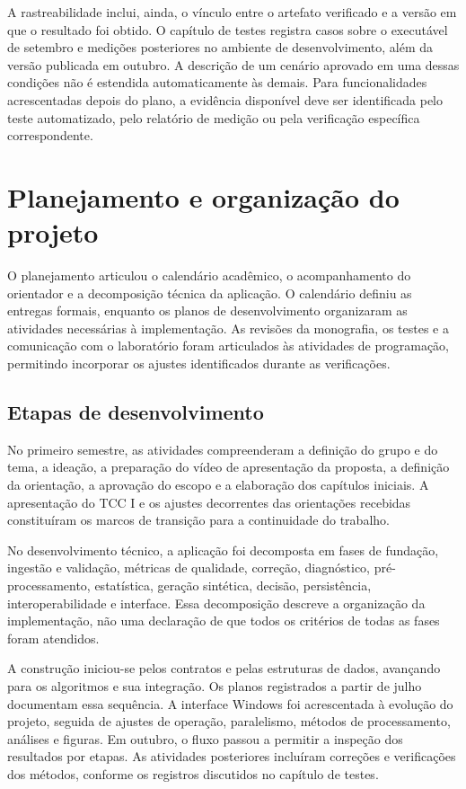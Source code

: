 A rastreabilidade inclui, ainda, o vínculo entre o artefato verificado e a versão em que o resultado foi obtido. O capítulo de testes registra casos sobre o executável de setembro e medições posteriores no ambiente de desenvolvimento, além da versão publicada em outubro. A descrição de um cenário aprovado em uma dessas condições não é estendida automaticamente às demais. Para funcionalidades acrescentadas depois do plano, a evidência disponível deve ser identificada pelo teste automatizado, pelo relatório de medição ou pela verificação específica correspondente.

\section{Planejamento e organização do projeto}

O planejamento articulou o calendário acadêmico, o acompanhamento do orientador e a decomposição técnica da aplicação. O calendário definiu as entregas formais, enquanto os planos de desenvolvimento organizaram as atividades necessárias à implementação. As revisões da monografia, os testes e a comunicação com o laboratório foram articulados às atividades de programação, permitindo incorporar os ajustes identificados durante as verificações.

\subsection{Etapas de desenvolvimento}

No primeiro semestre, as atividades compreenderam a definição do grupo e do tema, a ideação, a preparação do vídeo de apresentação da proposta, a definição da orientação, a aprovação do escopo e a elaboração dos capítulos iniciais. A apresentação do TCC I e os ajustes decorrentes das orientações recebidas constituíram os marcos de transição para a continuidade do trabalho.

No desenvolvimento técnico, a aplicação foi decomposta em fases de fundação, ingestão e validação, métricas de qualidade, correção, diagnóstico, pré-processamento, estatística, geração sintética, decisão, persistência, interoperabilidade e interface. Essa decomposição descreve a organização da implementação, não uma declaração de que todos os critérios de todas as fases foram atendidos.

A construção iniciou-se pelos contratos e pelas estruturas de dados, avançando para os algoritmos e sua integração. Os planos registrados a partir de julho documentam essa sequência. A interface Windows foi acrescentada à evolução do projeto, seguida de ajustes de operação, paralelismo, métodos de processamento, análises e figuras. Em outubro, o fluxo passou a permitir a inspeção dos resultados por etapas. As atividades posteriores incluíram correções e verificações dos métodos, conforme os registros discutidos no capítulo de testes.

